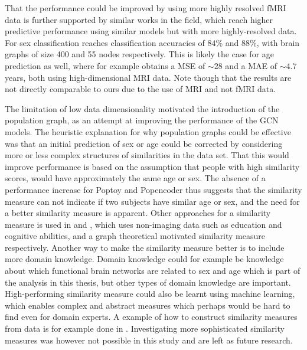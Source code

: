 

That the performance could be improved by using more highly resolved fMRI data is further supported by similar works in the field, which reach higher predictive performance using similar models but with more highly-resolved data. For sex classification \cite{arslan, understanding_gnn} reaches classification accuracies of $84\%$ and $88\%$, with brain graphs of size 400 and 55 nodes respectively. This is likely the case for age prediction as well, where for example \cite{stankeviciute} obtains a MSE of $\sim28$ and \cite{amoroso_multiplex_age} a MAE of $\sim4.7$ years, both using high-dimensional MRI data. Note though that the results are not directly comparable to ours due to the use of MRI and not fMRI data.

The limitation of low data dimensionality motivated the introduction of the population graph, as an attempt at improving the performance of the GCN models. The heuristic explanation for why population graphs could be effective was that an initial prediction of sex or age could be corrected by considering more or less complex structures of similarities in the data set. That this would improve performance is based on the assumption that people with high similarity scores, would have approximately the same age or sex. The absence of a performance increase for Poptoy and Popencoder thus suggests that the similarity measure can not indicate if two subjects have similar age or sex, and the need for a better similarity measure is apparent. Other approaches for a similarity measure is used in \cite{stankeviciute} and \cite{higcn}, which uses non-imaging data such as education and cognitive abilities, and a graph theoretical motivated similarity measure respectively. Another way to make the similarity measure better is to include more domain knowledge. Domain knowledge could for example be knowledge about which functional brain networks are related to sex and age which is part of the analysis in this thesis, but other types of domain knowledge are important. High-performing similarity measure could also be learnt using machine learning, which enables complex and abstract measures which perhaps would be hard to find even for domain experts. A example of how to construct similarity measures from data is for example done in \cite{sim_meas_constr}. Investigating more sophisticated similarity measures was however not possible in this study and are left as future research. 


